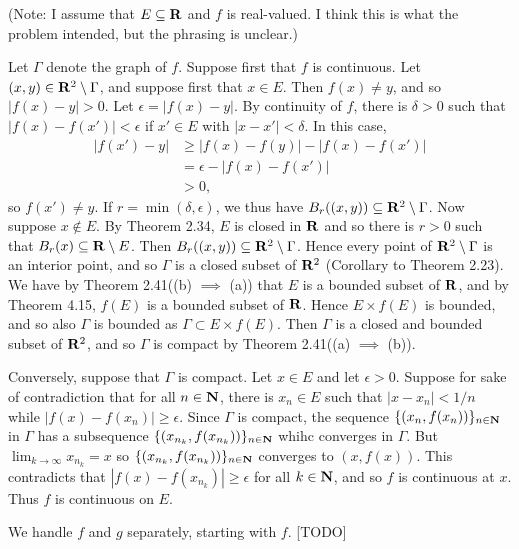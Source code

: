 \begin{ex}
(Note: I assume that $E \subseteq \mathbf{R}$ and $f$ is real-valued. I think this is what the problem intended, but the phrasing is unclear.)

Let $\Gamma$ denote the graph of $f$. Suppose first that $f$ is continuous. Let $(x, y) \in \mathbf{R}^2\setminus\Gamma$, and suppose first that $x \in E$. Then $f(x) \not = y$, and so $|f(x) - y| > 0$. Let $\epsilon = |f(x) - y|$. By continuity of $f$, there is $\delta > 0$ such that $|f(x) - f(x')| < \epsilon$ if $x' \in E$ with $|x-x'| < \delta$. In this case,
\begin{align*}
|f(x') - y| & \geq |f(x) - f(y)| - |f(x) - f(x')|\\
& = \epsilon - |f(x) - f(x')|\\
& > 0,
\end{align*}
so $f(x') \not = y$. If $r = \min(\delta, \epsilon)$, we thus have $B_r((x, y)) \subseteq \mathbf{R}^2\setminus\Gamma$. Now suppose $x \not \in E$. By Theorem 2.34, $E$ is closed in $\mathbf{R}$ and so there is $r > 0$ such that $B_r(x) \subseteq \mathbf{R}\setminus E$. Then $B_r((x, y)) \subseteq \mathbf{R}^2\setminus\Gamma$. Hence every point of $\mathbf{R}^2\setminus\Gamma$ is an interior point, and so $\Gamma$ is a closed subset of $\mathbf{R}^2$ (Corollary to Theorem 2.23). We have by Theorem 2.41((b) $\implies$ (a)) that $E$ is a bounded subset of $\mathbf{R}$, and by Theorem 4.15, $f(E)$ is a bounded subset of $\mathbf{R}$. Hence $E\times f(E)$ is bounded, and so also $\Gamma$ is bounded as $\Gamma \subset E\times f(E)$. Then $\Gamma$ is a closed and bounded subset of $\mathbf{R}^2$, and so $\Gamma$ is compact by Theorem 2.41((a) $\implies$ (b)).

Conversely, suppose that $\Gamma$ is compact. Let $x \in E$ and let $\epsilon > 0$. Suppose for sake of contradiction that for all $n \in \mathbf{N}$, there is $x_n \in E$ such that $|x-x_n| < 1/n$ while $|f(x) - f(x_n)| \geq \epsilon$. Since $\Gamma$ is compact, the sequence $\{(x_n, f(x_n))\}_{n \in \mathbf{N}}$ in $\Gamma$ has a subsequence $\{(x_{n_k}, f(x_{n_k}))\}_{n \in \mathbf{N}}$ whihc converges in $\Gamma$. But $\lim_{k\to\infty}x_{n_k} = x$ so $\{(x_{n_k}, f(x_{n_k}))\}_{n \in \mathbf{N}}$ converges to $(x, f(x))$. This contradicts that $|f(x) - f(x_{n_k})| \geq \epsilon$ for all $k \in \mathbf{N}$, and so $f$ is continuous at $x$. Thus $f$ is continuous on $E$.
\end{ex}

\begin{ex}
We handle $f$ and $g$ separately, starting with $f$. [TODO]
\end{ex}

